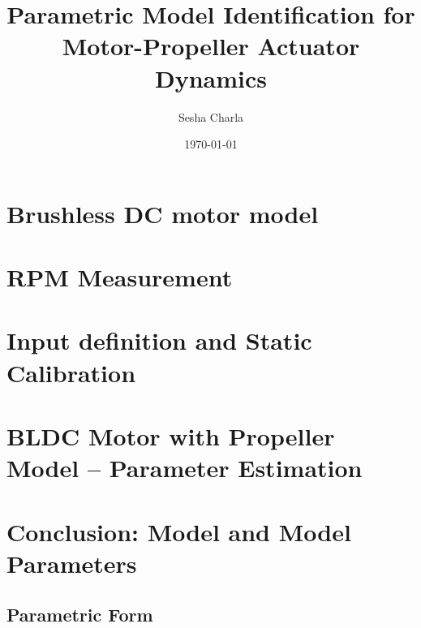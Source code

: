 \documentclass[letterpaper, 11pt]{article}
\title{Parametric Model Identification for Motor-Propeller Actuator Dynamics}
\author{Sesha Charla}
\date{\today}
\begin{document}
\maketitle
\tableofcontents
\newpage
\newpage
\newpage
\section{Brushless DC motor model}



\newpage
\section{RPM Measurement}

\newpage
\section{Input definition and Static Calibration}


\newpage
\section{BLDC Motor with Propeller Model -- Parameter Estimation}



\newpage
\section{Conclusion: Model and Model Parameters}
\subsection{Parametric Form}
\newpage


\end{document}
